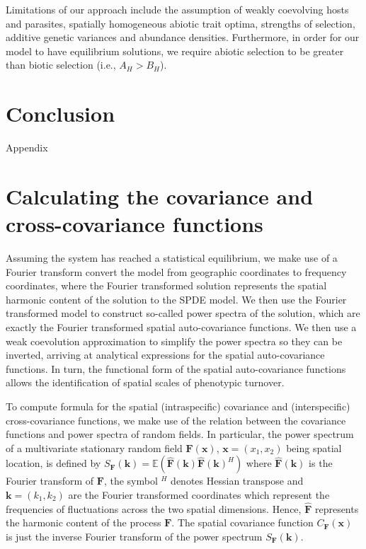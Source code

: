 \documentclass{article}
\begin{document}
Limitations of our approach include the assumption of weakly coevolving
hosts and parasites, spatially homogeneous abiotic trait optima,
strengths of selection, additive genetic variances and abundance
densities. Furthermore, in order for our model to have equilibrium
solutions, we require abiotic selection to be greater than biotic
selection (i.e., \(A_H>B_H\)).

\hypertarget{conclusion}{%
\section{Conclusion}\label{conclusion}}

\newpage

\appendix

\begin{center}
\Large{Appendix}
\end{center}

\hypertarget{calculating-the-covariance-and-cross-covariance-functions}{%
\section{\texorpdfstring{Calculating the covariance and cross-covariance
functions
\label{spde-app}}{Calculating the covariance and cross-covariance functions }}\label{calculating-the-covariance-and-cross-covariance-functions}}

Assuming the system has reached a statistical equilibrium, we make use
of a Fourier transform convert the model from geographic coordinates to
frequency coordinates, where the Fourier transformed solution represents
the spatial harmonic content of the solution to the SPDE model. We then
use the Fourier transformed model to construct so-called power spectra
of the solution, which are exactly the Fourier transformed spatial
auto-covariance functions. We then use a weak coevolution approximation
to simplify the power spectra so they can be inverted, arriving at
analytical expressions for the spatial auto-covariance functions. In
turn, the functional form of the spatial auto-covariance functions
allows the identification of spatial scales of phenotypic turnover.

To compute formula for the spatial (intraspecific) covariance and
(interspecific) cross-covariance functions, we make use of the relation
between the covariance functions and power spectra of random fields. In
particular, the power spectrum of a multivariate stationary random field
\(\pmb F(\pmb x)\), \(\pmb x=(x_1,x_2)\) being spatial location, is
defined by
\(S_{\pmb F}(\pmb k)=\mathbb E\left(\hat{\pmb F}(\pmb k)\hat{\pmb F}(\pmb k)^H\right)\)
where \(\hat{\pmb F}(\pmb k)\) is the Fourier transform of \(\pmb F\),
the symbol \(^H\) denotes Hessian transpose and \(\pmb k=(k_1,k_2)\) are
the Fourier transformed coordinates which represent the frequencies of
fluctuations across the two spatial dimensions. Hence, \(\hat{\pmb F}\)
represents the harmonic content of the process \(\pmb F\). The spatial
covariance function \(C_{\pmb F}(\pmb x)\) is just the inverse Fourier
transform of the power spectrum \(S_{\pmb F}(\pmb k)\).
\end{document}
